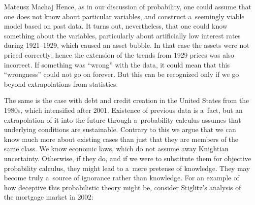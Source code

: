 \begin{artengenv}{Mateusz Machaj}
Hence, as in our discussion of probability, one could assume that one does not know about particular variables, and construct a~seemingly viable model based on past data. It turns out, nevertheless, that one could know something about the variables, particularly about artificially low interest rates during 1921–1929, which caused an asset bubble. In that case the assets were not priced correctly; hence the extension of the trends from 1929 prices was also incorrect. If something was ``wrong'' with the data, it could mean that this ``wrongness'' could not go on forever. But this can be recognized only if we go beyond extrapolations from statistics.



The same is the case with debt and credit creation in the United States from the 1980s, which intensified after 2001. Existence of previous data is a~fact, but an extrapolation of it into the future through a~probability calculus assumes that underlying conditions are sustainable. Contrary to this we argue that we can know much more about existing cases than just that they are members of the same class. We know economic laws, which do not assume away Knightian uncertainty. Otherwise, if they do, and if we were to substitute them for objective probability calculus, they might lead to a~mere pretense of knowledge. They may become truly a~source of ignorance rather than knowledge. For an example of how deceptive this probabilistic theory might be, consider Stiglitz's analysis of the mortgage market in 2002:




\end{artengenv}
